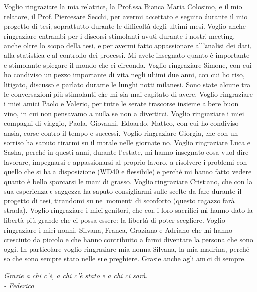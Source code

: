 Voglio ringraziare la mia relatrice, la Prof.ssa Bianca Maria Colosimo, e il mio relatore, il Prof. Piercesare Secchi, per avermi accettato e seguito durante il mio progetto di tesi, soprattutto durante le difficoltà degli ultimi mesi. Voglio anche ringraziare entrambi per i discorsi stimolanti avuti durante i nostri meeting, anche oltre lo scopo della tesi, e per avermi fatto appassionare all'analisi dei dati, alla statistica e al controllo dei processi. Mi avete insegnato quanto è importante e stimolante spiegare il mondo che ci circonda. Voglio ringraziare Simone, con cui ho condiviso un pezzo importante di vita negli ultimi due anni, con cui ho riso, litigato, discusso e parlato durante le lunghi notti milanesi. Sono state alcune tra le conversazioni più stimolanti che mi sia mai capitato di avere. Voglio ringraziare i miei amici Paolo e Valerio, per tutte le serate trascorse insieme a bere buon vino, in cui non pensavamo a nulla se non a divertirci. Voglio ringraziare i miei compagni di viaggio, Paola, Giovanni, Edoardo, Matteo, con cui ho condiviso ansia, corse contro il tempo e successi. Voglio ringraziare Giorgia, che con un sorriso ha saputo tirarmi su il morale nelle giornate no. Voglio ringraziare Luca e Sasha, perché in questi anni, durante l'estate, mi hanno insegnato cosa vuol dire lavorare, impegnarsi e appassionarsi al proprio lavoro, a risolvere i problemi con quello che si ha a disposizione (WD40 e flessibile) e perché mi hanno fatto vedere quanto è bello sporcarsi le mani di grasso. Voglio ringraziare Cristiano, che con la sua esperienza e saggezza ha saputo consigliarmi sulle scelte da fare durante il progetto di tesi, tirandomi su nei momenti di sconforto (questo ragazzo farà strada). Voglio ringraziare i miei genitori, che con i loro sacrifici mi hanno dato la libertà più grande che ci possa essere: la libertà di poter scegliere. Voglio ringraziare i miei nonni, Silvana, Franca, Graziano e Adriano che mi hanno cresciuto da piccolo e che hanno contribuito a farmi diventare la persona che sono oggi. In particolare voglio ringraziare mia nonna Silvana, la mia madrina, perché so che sono sempre stato nelle sue preghiere. Grazie anche agli amici di sempre.
\vspace{0.8cm}
\begin{flushright}
    \begin{minipage}{0.5\textwidth}
        \small
        \textit{Grazie a chi c'è, a chi c'è stato e a chi ci sarà.}\\
        \hfill \textit{- Federico}
    \end{minipage}
\end{flushright}